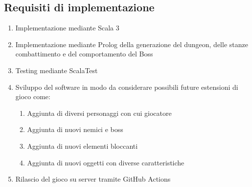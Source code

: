 \subsection{Requisiti di implementazione}

\begin{enumerate}
\item Implementazione mediante Scala 3
\item Implementazione mediante Prolog della generazione del dungeon, delle stanze combattimento e del comportamento del Boss
\item Testing mediante ScalaTest
\item Sviluppo del software in modo da considerare possibili future estensioni di gioco come:
\begin{enumerate}
    \item Aggiunta di diversi personaggi con cui giocatore
    \item Aggiunta di nuovi nemici e boss
    \item Aggiunta di nuovi elementi bloccanti
    \item Aggiunta di nuovi oggetti con diverse caratteristiche
\end{enumerate}
\item Rilascio del gioco su server tramite GitHub Actions
\end{enumerate}